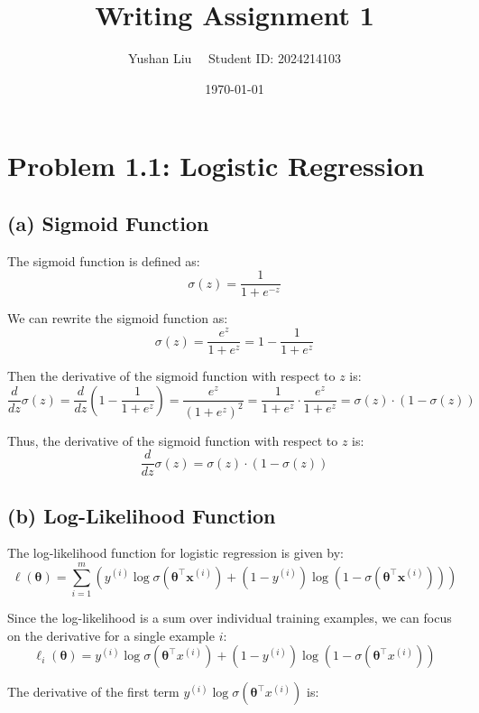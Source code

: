 \documentclass[12pt]{article}
\begin{document}
\title{Writing Assignment 1}
\author{Yushan Liu  \ \  Student ID: 2024214103}
\date{\today}

\maketitle

\section*{Problem 1.1: Logistic Regression}

\subsection*{(a) Sigmoid Function}

The sigmoid function is defined as:
\[
    \sigma(z) = \frac{1}{1 + e^{-z}}
\]

We can rewrite the sigmoid function as:
\[
    \sigma(z) = \frac{e^z}{1 + e^z} = 1 - \frac{1}{1 + e^z}
\]

Then the derivative of the sigmoid function with respect to \( z \) is:
\[
    \frac{d}{dz} \sigma(z) = \frac{d}{dz} \left( 1 - \frac{1}{1 + e^z} \right) = \frac{e^z}{(1 + e^z)^2} = \frac{1}{1 + e^z} \cdot \frac{e^z}{1 + e^z} = \sigma(z) \cdot (1 - \sigma(z))
\]

Thus, the derivative of the sigmoid function with respect to \( z \) is:
\[
    \frac{d}{dz} \sigma(z) = \sigma(z) \cdot (1 - \sigma(z))
\]

\subsection*{(b) Log-Likelihood Function}

The log-likelihood function for logistic regression is given by:
\[
    \ell(\boldsymbol{\theta}) = \sum_{i=1}^{m} \left( y^{(i)} \log \sigma(\boldsymbol{\theta}^\top \boldsymbol{x}^{(i)}) + (1 - y^{(i)}) \log(1 - \sigma(\boldsymbol{\theta}^\top \boldsymbol{x}^{(i)})) \right)
\]

Since the log-likelihood is a sum over individual training examples, we can focus on the derivative for a single example \(i\):
\[
    \ell_i(\boldsymbol\theta) = y^{(i)} \log \sigma(\boldsymbol\theta^\top x^{(i)}) + (1 - y^{(i)}) \log(1 - \sigma(\boldsymbol\theta^\top x^{(i)}))
\]

The derivative of the first term \(y^{(i)} \log \sigma(\boldsymbol\theta^\top x^{(i)})\) is:
\end{document}
